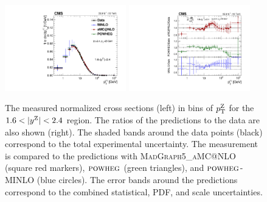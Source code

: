 \begin{figure}
	\centering
	\includegraphics[width=0.47\textwidth]{figures/zpt/zll_double_normrap4.pdf}
        \includegraphics[width=0.47\textwidth]{figures/zpt/zll_double_ratio_normrap4.pdf}
	\caption{The measured normalized cross sections (left) in bins of $p_{\mathrm{T}}^{\mathrm{Z}}$ for the $1.6 < |y^{\mathrm{Z}}| < 2.4$ region. The ratios of the predictions to the data are also shown (right). The shaded bands around the data points (black) correspond to the total experimental uncertainty. The measurement is compared to the predictions with \textsc{MadGraph5\_aMC@NLO} (square red markers),  ${\textsc{powheg}}$ (green triangles), and ${\textsc{powheg}}$-\textsc{MINLO} (blue circles). The error bands around the predictions correspond to the combined statistical, PDF, and scale uncertainties.}
	\label{fig:zll_norm4}
\end{figure}

